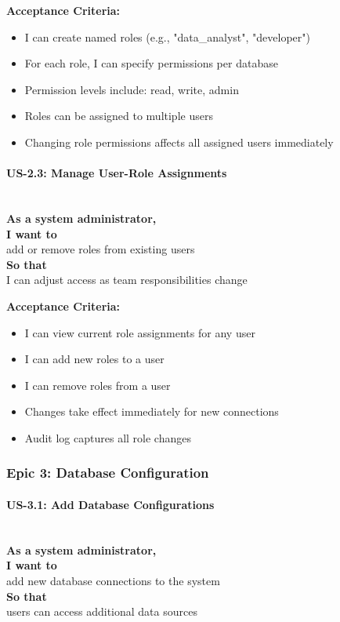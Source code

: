 \noindent\textbf{Acceptance Criteria:}
\begin{itemize}
    \item I can create named roles (e.g., "data\_analyst", "developer")
    \item For each role, I can specify permissions per database
    \item Permission levels include: read, write, admin
    \item Roles can be assigned to multiple users
    \item Changing role permissions affects all assigned users immediately
\end{itemize}

\paragraph{US-2.3: Manage User-Role Assignments}
\mbox{}\\[0.5em]

\noindent\textbf{As a system administrator,} \\
\textbf{I want to} \\
add or remove roles from existing users \\
\textbf{So that} \\
I can adjust access as team responsibilities change

\noindent\textbf{Acceptance Criteria:}
\begin{itemize}
    \item I can view current role assignments for any user
    \item I can add new roles to a user
    \item I can remove roles from a user
    \item Changes take effect immediately for new connections
    \item Audit log captures all role changes
\end{itemize}

\subsubsection{Epic 3: Database Configuration}

\paragraph{US-3.1: Add Database Configurations}
\mbox{}\\[0.5em]

\noindent\textbf{As a system administrator,} \\
\textbf{I want to} \\
add new database connections to the system \\
\textbf{So that} \\
users can access additional data sources

